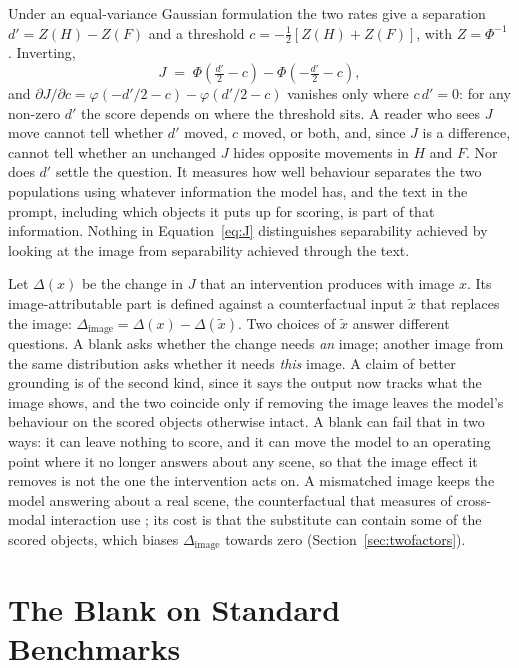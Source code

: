 \documentclass{article} %
\newcommand{\dSight}{\ensuremath{\Delta_{\mathrm{image}}}}
\begin{document}
Under an equal-variance Gaussian formulation the
two rates give a separation $d' = Z(H) - Z(F)$ and a threshold $c = -\tfrac{1}{2}[Z(H) + Z(F)]$, with
$Z = \Phi^{-1}$ \citep{snodgrass1988}. Inverting,
\begin{equation}
J \;=\; \Phi\!\left(\tfrac{d'}{2} - c\right) - \Phi\!\left(-\tfrac{d'}{2} - c\right),
\label{eq:J}
\end{equation}
and $\partial J/\partial c = \varphi(-d'/2 - c) - \varphi(d'/2 - c)$ vanishes only where $c\,d' = 0$: for
any non-zero $d'$ the score depends on where the threshold sits. A reader who sees $J$ move cannot tell
whether $d'$ moved, $c$ moved, or both, and, since $J$ is a difference, cannot tell whether an unchanged
$J$ hides opposite movements in $H$ and $F$. Nor does $d'$ settle the question. It measures how well
behaviour separates the two populations using whatever information the model has, and the text in the
prompt, including which objects it puts up for scoring, is part of that information. Nothing in
Equation~\ref{eq:J} distinguishes separability achieved by looking at the image from separability
achieved through the text.

Let $\Delta(x)$ be the change in $J$ that an
intervention produces with image $x$. Its image-attributable part is defined against a counterfactual
input $\tilde{x}$ that replaces the image: $\dSight = \Delta(x) - \Delta(\tilde{x})$. Two choices of
$\tilde{x}$ answer different questions. A blank asks whether the change needs \emph{an} image; another
image from the same distribution asks whether it needs \emph{this} image. A claim of better grounding
is of the second kind, since it says the output now tracks what the image shows, and the two coincide
only if removing the image leaves the model's behaviour on the scored objects otherwise intact. A blank
can fail that in two ways: it can leave nothing to score, and it can move the model to an operating
point where it no longer answers about any scene, so that the image effect it removes is not the one
the intervention acts on. A mismatched image keeps the model answering about a real scene, the
counterfactual that measures of cross-modal interaction use \citep{hessel2020emap, gat2021perceptual};
its cost is that the substitute can contain some of the scored objects, which biases $\dSight$ towards
zero (Section~\ref{sec:twofactors}).

\section{The Blank on Standard Benchmarks}
\label{sec:mitigation}
\end{document}
